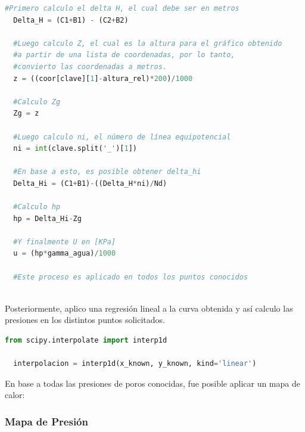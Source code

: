 \begin{lstlisting}[language=Python]
  #Primero calculo el delta H, el cual debe ser en metros
  Delta_H = (C1+B1) - (C2+B2)

  #Luego calculo Z, el cual es la altura para el gráfico obtenido
  #a partir de una lista de coordenadas, por lo tanto, 
  #convierto las coordenadas a metros.
  z = ((coor[clave][1]-altura_rel)*200)/1000

  #Calculo Zg
  Zg = z

  #Luego calculo ni, el número de línea equipotencial
  ni = int(clave.split('_')[1])

  #En base a esto, es posible obtener delta_hi
  Delta_Hi = (C1+B1)-((Delta_H*ni)/Nd)

  #Calculo hp
  hp = Delta_Hi-Zg

  #Y finalmente U en [KPa]
  u = (hp*gamma_agua)/1000
  
  #Este proceso es aplicado en todos los puntos conocidos
  
\end{lstlisting}

Posteriormente, aplico una regresión lineal a la curva obtenida y así calculo las presiones en los distintos puntos solicitados.

\begin{lstlisting}[language=Python]
  from scipy.interpolate import interp1d

  interpolacion = interp1d(x_known, y_known, kind='linear')
\end{lstlisting}

En base a todas las presiones de poros conocidas, fue posible aplicar un mapa de calor:

\subsubsection{Mapa de Presión}

